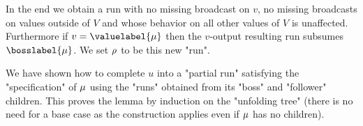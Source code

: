 In the end we obtain a run with no missing broadcast on $v$, no missing broadcasts on values outside of $V$ and whose behavior on all other values of $V$ is unaffected. Furthermore if $v = \valuelabel{\node}$ then the $v$-output resulting run subsumes $\bosslabel{\node}$. We set $\rho$ to be this new "run".

We have shown how to complete $u$ into a "partial run" satisfying the "specification" of $\mu$ using the "runs" obtained from its "boss" and "follower" children. This proves the lemma by induction on the "unfolding tree" (there is no need for a base case as the construction applies even if $\mu$ has no children).
